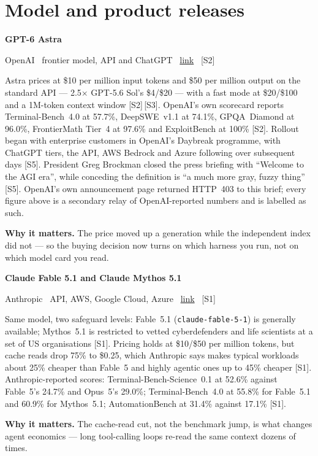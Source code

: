 \documentclass[11pt,a4paper]{article}
\newcommand{\entry}[4]{%
  \par\vspace{0.7em}%
  {\sffamily\bfseries\color{brandink}#1}\par
  {\footnotesize\color{brandgrey}#2 \textbullet\ \href{#3}{link} \textbullet\ \srcref{#4}}\par
  \vspace{0.15em}}
\newcommand{\why}[1]{\par{\small\textbf{Why it matters.} #1}\par}
\newcommand{\srcref}[1]{\textcolor{brandaccent}{[S#1]}}
\begin{document}
\section{Model and product releases}

\entry{GPT-6 Astra}{OpenAI \textbullet\ frontier model, API and ChatGPT}{https://openai.com/index/gpt-6-astra/}{2}
Astra prices at \$10 per million input tokens and \$50 per million output on the standard
API --- 2.5$\times$ GPT-5.6 Sol's \$4/\$20 --- with a fast mode at \$20/\$100 and a
1M-token context window \srcref{2}\,\srcref{3}. OpenAI's own scorecard reports
Terminal-Bench~4.0 at 57.7\%, DeepSWE~v1.1 at 74.1\%, GPQA~Diamond at 96.0\%,
FrontierMath Tier~4 at 97.6\% and ExploitBench at 100\% \srcref{2}. Rollout began with
enterprise customers in OpenAI's Daybreak programme, with ChatGPT tiers, the API, AWS
Bedrock and Azure following over subsequent days \srcref{5}. President Greg Brockman
closed the press briefing with ``Welcome to the AGI era'', while conceding the definition
is ``a much more gray, fuzzy thing'' \srcref{5}. OpenAI's own announcement page returned
HTTP~403 to this brief; every figure above is a secondary relay of OpenAI-reported numbers
and is labelled as such.
\why{The price moved up a generation while the independent index did not --- so the
buying decision now turns on which harness you run, not on which model card you read.}

\entry{Claude Fable 5.1 and Claude Mythos 5.1}{Anthropic \textbullet\ API, AWS, Google Cloud, Azure}{https://www.anthropic.com/claude-fable-and-mythos-5-1}{1}
Same model, two safeguard levels: Fable~5.1 (\texttt{claude-fable-5-1}) is generally
available; Mythos~5.1 is restricted to vetted cyberdefenders and life scientists at a set
of US organisations \srcref{1}. Pricing holds at \$10/\$50 per million tokens, but cache
reads drop 75\% to \$0.25, which Anthropic says makes typical workloads about 25\% cheaper
than Fable~5 and highly agentic ones up to 45\% cheaper \srcref{1}. Anthropic-reported
scores: Terminal-Bench-Science~0.1 at 52.6\% against Fable~5's 24.7\% and Opus~5's 29.0\%;
Terminal-Bench~4.0 at 55.8\% for Fable~5.1 and 60.9\% for Mythos~5.1; AutomationBench at
31.4\% against 17.1\% \srcref{1}.
\why{The cache-read cut, not the benchmark jump, is what changes agent economics --- long
tool-calling loops re-read the same context dozens of times.}
\end{document}
